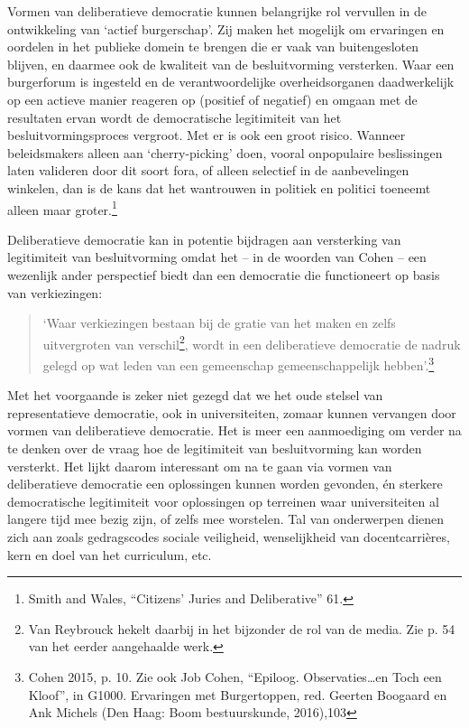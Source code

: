 \documentclass[empirical, authordate, ]{new-jote-article}
\begin{document}
	Vormen van deliberatieve democratie kunnen belangrijke rol vervullen in de ontwikkeling van ‘actief burgerschap'. Zij maken het mogelijk om ervaringen en oordelen in het publieke domein te brengen die er vaak van buitengesloten blijven, en daarmee ook de kwaliteit van de besluitvorming versterken. Waar een burgerforum is ingesteld en de verantwoordelijke overheidsorganen daadwerkelijk op een actieve manier reageren op (positief of negatief) en omgaan met de resultaten ervan wordt de democratische legitimiteit van het besluitvormingsproces vergroot. Met er is ook een groot risico. Wanneer beleidsmakers alleen aan ‘cherry-picking' doen, vooral onpopulaire beslissingen laten valideren door dit soort fora, of alleen selectief in de aanbevelingen winkelen, dan is de kans dat het wantrouwen in politiek en politici toeneemt alleen maar groter.\footnote{Smith and Wales, “Citizens' Juries and Deliberative” 61.}



	Deliberatieve democratie kan in potentie bijdragen aan versterking van legitimiteit van besluitvorming omdat het -- in de woorden van Cohen -- een wezenlijk ander perspectief biedt dan een democratie die functioneert op basis van verkiezingen:

	\begin{quote}
		\itshape

		‘Waar verkiezingen bestaan bij de gratie van het maken en zelfs uitvergroten van verschil\footnote{Van Reybrouck hekelt daarbij in het bijzonder de rol van de media. Zie p. 54 van het eerder aangehaalde werk.}, wordt in een deliberatieve democratie de nadruk gelegd op wat leden van een gemeenschap gemeenschappelijk hebben'.\footnote{Cohen 2015, p. 10. Zie ook Job Cohen, “Epiloog. Observaties…en Toch een Kloof”, in G1000. Ervaringen met Burgertoppen, red. Geerten Boogaard en Ank Michels (Den Haag: Boom bestuurskunde, 2016),103}
	\end{quote}

	Met het voorgaande is zeker niet gezegd dat we het oude stelsel van representatieve democratie, ook in universiteiten, zomaar kunnen vervangen door vormen van deliberatieve democratie. Het is meer een aanmoediging om verder na te denken over de vraag hoe de legitimiteit van besluitvorming kan worden versterkt. Het lijkt daarom interessant om na te gaan via vormen van deliberatieve democratie een oplossingen kunnen worden gevonden, én sterkere democratische legitimiteit voor oplossingen op terreinen waar universiteiten al langere tijd mee bezig zijn, of zelfs mee worstelen. Tal van onderwerpen dienen zich aan zoals gedragscodes sociale veiligheid, wenselijkheid van docentcarrières, kern en doel van het curriculum, etc.
\end{document}
